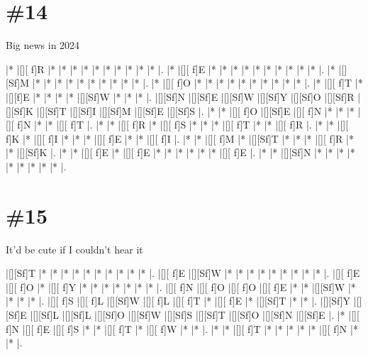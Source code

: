 \documentclass[letterpaper]{article}
\begin{document}
\section*{\#14}
Big news in 2024

\vspace*{1em}
\begin{Puzzle}{12}{12}
|*        |[][ f]R  |*        |*        |*        |*        |*        |*        |*        |*        |*        |*        |.
|*        |[][ f]E  |*        |*        |*        |*        |*        |*        |*        |*        |*        |*        |.
|*        |[][Sf]M  |*        |*        |*        |*        |*        |*        |*        |*        |*        |*        |.
|*        |[][ f]O  |*        |*        |*        |*        |*        |*        |*        |*        |*        |*        |.
|*        |[][ f]T  |*        |[][f]E   |*        |*        |*        |*        |[][Sf]W  |*        |*        |*        |.
|[][Sf]N  |[][Sf]E  |[][Sf]W  |[][Sf]Y  |[][Sf]O  |[][Sf]R  |[][Sf]K  |[][Sf]T  |[][Sf]I  |[][Sf]M  |[][Sf]E  |[][Sf]S  |.
|*        |*        |[][ f]O  |[][Sf]E  |[][ f]N  |*        |*        |*        |[][ f]N  |*        |*        |[][ f]T  |.
|*        |*        |[][ f]R  |*        |[][ f]S  |*        |*        |*        |[][ f]T  |*        |*        |[][ f]R  |.
|*        |*        |[][ f]K  |*        |[][ f]I  |*        |*        |*        |[][ f]E  |*        |*        |[][ f]I  |.
|*        |*        |[][ f]M  |*        |[][Sf]T  |*        |*        |*        |[][ f]R  |*        |*        |[][Sf]K  |.
|*        |*        |[][ f]E  |*        |[][ f]E  |*        |*        |*        |*        |*        |*        |[][ f]E  |.
|*        |*        |[][Sf]N  |*        |*        |*        |*        |*        |*        |*        |*        |*        |.
\end{Puzzle}

\section*{\#15}
It'd be cute if I couldn't hear it

\vspace*{1em}
\begin{Puzzle}{11}{9}
|[][Sf]T  |*        |*        |*        |*        |*        |*        |*        |*        |*        |*        |.
|[][ f]E  |[][Sf]W  |*        |*        |*        |*        |*        |*        |*        |*        |*        |.
|[][ f]E  |[][ f]O  |*        |[][ f]Y  |*        |*        |*        |*        |*        |*        |*        |.
|[][ f]N  |[][ f]O  |[][ f]O  |[][ f]E  |*        |*        |[][Sf]W  |*        |*        |*        |*        |.
|[][ f]S  |[][ f]L  |[][Sf]W  |[][ f]L  |[][ f]T  |*        |[][ f]E  |*        |[][Sf]T  |*        |*        |.
|[][Sf]Y  |[][Sf]E  |[][Sf]L  |[][Sf]L  |[][Sf]O  |[][Sf]W  |[][Sf]S  |[][Sf]T  |[][Sf]O  |[][Sf]N  |[][Sf]E  |.
|*        |[][ f]N  |[][ f]E  |[][ f]S  |*        |*        |[][ f]T  |*        |[][ f]W  |*        |*        |.
|*        |*        |[][ f]T  |*        |*        |*        |*        |*        |[][ f]N  |*        |*        |.
\end{Puzzle}
\end{document}
